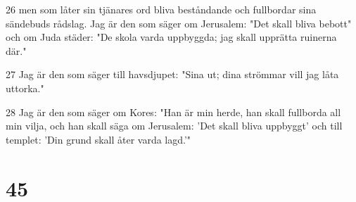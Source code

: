 \par 26 men som låter sin tjänares ord bliva beståndande och fullbordar sina sändebuds rådslag. Jag är den som säger om Jerusalem: "Det skall bliva bebott" och om Juda städer: "De skola varda uppbyggda; jag skall upprätta ruinerna där."
\par 27 Jag är den som säger till havsdjupet: "Sina ut; dina strömmar vill jag låta uttorka."
\par 28 Jag är den som säger om Kores: "Han är min herde, han skall fullborda all min vilja, och han skall säga om Jerusalem: 'Det skall bliva uppbyggt' och till templet: 'Din grund skall åter varda lagd.'"

\chapter{45}


